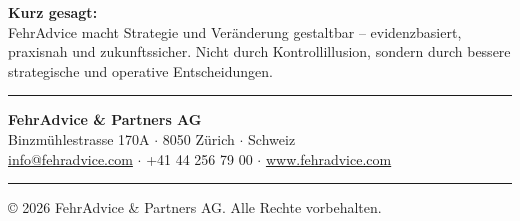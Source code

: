 \documentclass[11pt,a4paper]{article}
\begin{document}
\begin{recbox}
\textbf{Kurz gesagt:}\\
FehrAdvice macht Strategie und Veränderung gestaltbar -- evidenzbasiert, praxisnah und zukunftssicher. Nicht durch Kontrollillusion, sondern durch bessere strategische und operative Entscheidungen.
\end{recbox}

\vfill

\begin{center}
\hrule
\vspace{5mm}
\textbf{FehrAdvice \& Partners AG}\\
Binzmühlestrasse 170A $\cdot$ 8050 Zürich $\cdot$ Schweiz\\
\href{mailto:info@fehradvice.com}{info@fehradvice.com} $\cdot$ +41 44 256 79 00 $\cdot$ \href{https://www.fehradvice.com}{www.fehradvice.com}
\vspace{5mm}
\hrule
\vspace{3mm}
{\small\color{gray} © 2026 FehrAdvice \& Partners AG. Alle Rechte vorbehalten.}
\end{center}
\end{document}
